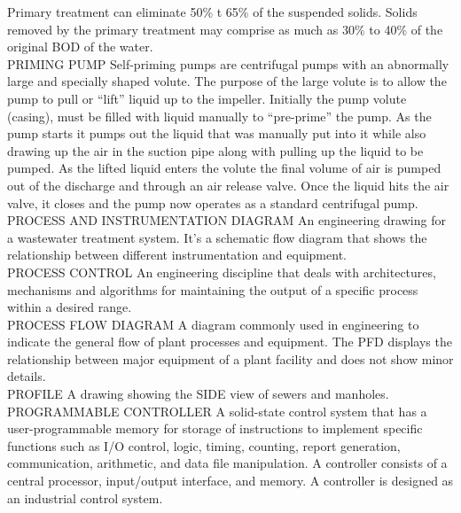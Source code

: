 \documentclass{article}
\begin{document}
Primary treatment can eliminate 50\% t 65\% of the suspended solids. Solids removed by the primary treatment may comprise as much as 30\% to 40\% of the original BOD of the water.
\vspace{0.3cm}\\
PRIMING PUMP
Self-priming pumps are centrifugal pumps with an abnormally large and specially shaped volute. The purpose of the large volute is to allow the pump to pull or “lift” liquid up to the impeller. Initially the pump volute (casing), must be filled with liquid manually to “pre-prime” the pump. As the pump starts it pumps out the liquid that was manually put into it while also drawing up the air in the suction pipe along with pulling up the liquid to be pumped. As the lifted liquid enters the volute the final volume of air is pumped out of the discharge and through an air release valve. Once the liquid hits the air valve, it closes and the pump now operates as a standard centrifugal pump.
\vspace{0.3cm}\\
PROCESS AND INSTRUMENTATION DIAGRAM
An engineering drawing for a wastewater treatment system. It’s a schematic flow diagram that shows the relationship between different instrumentation and equipment.
\vspace{0.3cm}\\
PROCESS CONTROL
An engineering discipline that deals with architectures, mechanisms and algorithms for maintaining the output of a specific process within a desired range.
\vspace{0.3cm}\\
PROCESS FLOW DIAGRAM
A diagram commonly used in engineering to indicate the general flow of plant processes and equipment. The PFD displays the relationship between major equipment of a plant facility and does not show minor details.
\vspace{0.3cm}\\
PROFILE
A drawing showing the SIDE view of sewers and manholes. 
\vspace{0.3cm}\\
PROGRAMMABLE CONTROLLER
A solid-state control system that has a user-programmable memory for storage of instructions to implement specific functions such as I/O control, logic, timing, counting, report generation, communication, arithmetic, and data file manipulation. A controller consists of a central processor, input/output interface, and memory. A controller is designed as an industrial control system.
\vspace{0.3cm}\\
\end{document}

